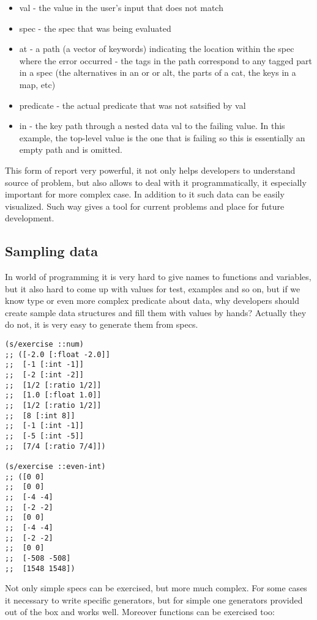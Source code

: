 \begin{itemize}
\item val - the value in the user’s input that does not match
\item spec - the spec that was being evaluated
\item at - a path (a vector of keywords) indicating the location within the spec where
the error occurred - the tags in the path correspond to any tagged part in a
spec (the alternatives in an or or alt, the parts of a cat, the keys in a map,
etc)
\item predicate - the actual predicate that was not satsified by val
\item in - the key path through a nested data val to the failing value. In this
example, the top-level value is the one that is failing so this is essentially
an empty path and is omitted.

\end{itemize}

This form of report very powerful, it not only helps developers to understand
source of problem, but also allows to deal with it programmatically, it
especially important for more complex case. In addition to it such data can be
easily visualized. Such way gives a tool for current problems and place for
future development.

\subsection{Sampling data}
\label{sec:samplingdata}
In world of programming it is very hard to give names to functions and
variables, but it also hard to come up with values for test, examples and so on,
but if we know type or even more complex predicate about data, why developers
should create sample data structures and fill them with values by hands?
Actually they do not, it is very easy to generate them from specs.

\begin{verbatim}
(s/exercise ::num)
;; ([-2.0 [:float -2.0]]
;;  [-1 [:int -1]]
;;  [-2 [:int -2]]
;;  [1/2 [:ratio 1/2]]
;;  [1.0 [:float 1.0]]
;;  [1/2 [:ratio 1/2]]
;;  [8 [:int 8]]
;;  [-1 [:int -1]]
;;  [-5 [:int -5]]
;;  [7/4 [:ratio 7/4]])

(s/exercise ::even-int)
;; ([0 0]
;;  [0 0]
;;  [-4 -4]
;;  [-2 -2]
;;  [0 0]
;;  [-4 -4]
;;  [-2 -2]
;;  [0 0]
;;  [-508 -508]
;;  [1548 1548])
\end{verbatim}

Not only simple specs can be exercised, but more much complex. For some cases it
necessary to write specific generators, but for simple one generators provided
out of the box and works well. Moreover functions can be exercised too:

